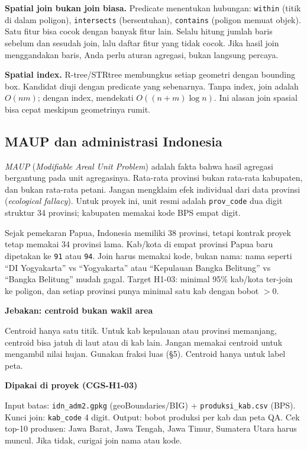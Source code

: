 \documentclass[9pt,a4paper]{extarticle}
\newcommand{\code}[1]{\texttt{\small\color{ink}#1}}
\newcommand{\term}[1]{\textit{#1}}
\newcommand{\prov}{\code{prov\_code}}
\newenvironment{projectbox}[1]
  {\begin{tcolorbox}[enhanced,breakable,colback=bg,colframe=bg,boxrule=0pt,arc=1.1mm,
    left=3mm,right=2.2mm,top=1.4mm,bottom=1.4mm,borderline west={2.2pt}{0pt}{ink},
    before skip=3pt,after skip=3pt]
   \textcolor{ink}{\sffamily\bfseries #1}\par\vspace{0.5pt}}
  {\end{tcolorbox}}
\newenvironment{warnbox}[1]
  {\begin{tcolorbox}[enhanced,breakable,colback=orangebg,colframe=orangebg,boxrule=0pt,arc=1.1mm,
    left=3mm,right=2.2mm,top=1.4mm,bottom=1.4mm,borderline west={2.2pt}{0pt}{accent2},
    before skip=3pt,after skip=3pt]
   \textcolor{accent2}{\sffamily\bfseries #1}\par\vspace{0.5pt}}
  {\end{tcolorbox}}
\begin{document}
\textbf{Spatial join bukan join biasa.} Predicate menentukan hubungan: \code{within} (titik di dalam poligon), \code{intersects} (bersentuhan), \code{contains} (poligon memuat objek). Satu fitur bisa cocok dengan banyak fitur lain. Selalu hitung jumlah baris sebelum dan sesudah join, lalu daftar fitur yang tidak cocok. Jika hasil join menggandakan baris, Anda perlu aturan agregasi, bukan langsung percaya.

\textbf{Spatial index.} R-tree/STRtree membungkus setiap geometri dengan bounding box. Kandidat diuji dengan predicate yang sebenarnya. Tanpa index, join adalah $O(nm)$; dengan index, mendekati $O((n+m)\log n)$. Ini alasan join spasial bisa cepat meskipun geometrinya rumit.

\subsection{MAUP dan administrasi Indonesia}

\term{MAUP} (\emph{Modifiable Areal Unit Problem}) adalah fakta bahwa hasil agregasi bergantung pada unit agregasinya. Rata-rata provinsi bukan rata-rata kabupaten, dan bukan rata-rata petani. Jangan mengklaim efek individual dari data provinsi (\emph{ecological fallacy}). Untuk proyek ini, unit resmi adalah \prov{} dua digit struktur 34 provinsi; kabupaten memakai kode BPS empat digit.

Sejak pemekaran Papua, Indonesia memiliki 38 provinsi, tetapi kontrak proyek tetap memakai 34 provinsi lama. Kab/kota di empat provinsi Papua baru dipetakan ke \code{91} atau \code{94}. Join harus memakai kode, bukan nama: nama seperti ``DI Yogyakarta'' vs ``Yogyakarta'' atau ``Kepulauan Bangka Belitung'' vs ``Bangka Belitung'' mudah gagal. Target H1-03: minimal 95\% kab/kota ter-join ke poligon, dan setiap provinsi punya minimal satu kab dengan bobot $>0$.

\begin{warnbox}{Jebakan: centroid bukan wakil area}
Centroid hanya satu titik. Untuk kab kepulauan atau provinsi memanjang, centroid bisa jatuh di laut atau di kab lain. Jangan memakai centroid untuk mengambil nilai hujan. Gunakan fraksi luas (\S5). Centroid hanya untuk label peta.
\end{warnbox}

\begin{projectbox}{Dipakai di proyek (CGS-H1-03)}
Input batas: \code{idn\_adm2.gpkg} (geoBoundaries/BIG) + \code{produksi\_kab.csv} (BPS). Kunci join: \code{kab\_code} 4 digit. Output: bobot produksi per kab dan peta QA. Cek top-10 produsen: Jawa Barat, Jawa Tengah, Jawa Timur, Sumatera Utara harus muncul. Jika tidak, curigai join nama atau kode.
\end{projectbox}
\end{document}
